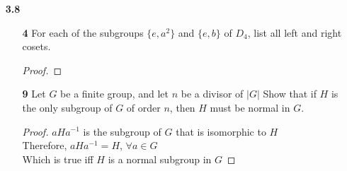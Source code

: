 \documentclass[paper=usletter, fontsize=12pt]{article}
\begin{document}
\begin{itemize}
\begin{enumerate}
\begin{proof}
            \end{proof}

            \item[\textbf{18}] Let the dihedral group $D_n$ be given by
            elements $a$ of order $n$ and $b$ of order 2, where $ba=a^{-1}b$.
            Show that any subgroup of $\langle a\rangle$ is normal in $D_n$.
            \begin{proof}

                Let $H$ be a subgroup of $\langle a\rangle$, such that any
                elements of the form $(a^m)^d\in H$\\
                Also, since $ba=a^{-1}b\in D_n$,
                \begin{align*}
                    ba^2 & = a^{-1}ba \\
                    & = a^{-1}a^{-1}b \\
                    & = a^{-2}b
                \end{align*}
                Thus, $ba^i=a^{-i}b$ for any $i$

            \end{proof}

        \end{enumerate}

        \item[\textbf{3.8}]
        \begin{enumerate}

            \item[\textbf{4}] For each of the subgroups $\{e, a^2\}$ and
            $\{e,b\}$ of $D_4$, list all left and right cosets.
            \begin{proof}
            \end{proof}

            \item[\textbf{9}] Let $G$ be a finite group, and let $n$ be a
            divisor of $|G|$ Show that if $H$ is the only subgroup of $G$ of
            order $n$, then $H$ must be normal in $G$.
            \begin{proof}

                $aHa^{-1}$ is the subgroup of $G$ that is isomorphic to $H$\\
                Therefore, $aHa^{-1}=H$, $\forall a \in G$\\
                Which is true iff $H$ is a normal subgroup in $G$ \qedhere

            \end{proof}


\end{enumerate}
\end{itemize}
\end{document}
